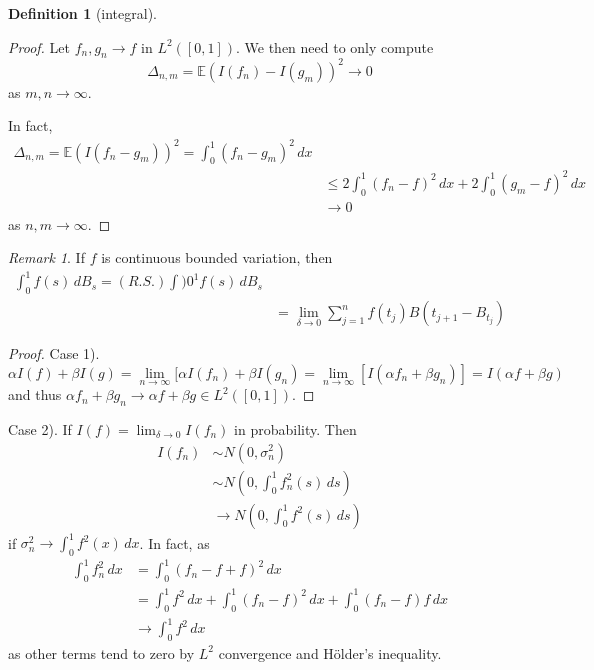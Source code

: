 \documentclass[10pt, oneside, reqno]{amsart}
\theoremstyle{plain}%
\theoremstyle{definition}
\newtheorem{defn}[thm]{Definition}
\theoremstyle{remark}
\newtheorem*{rem}{Remark}
\newcommand{\E}{\mathbb{E}}
\begin{document}
\begin{defn}[\ito integral]
    \begin{proof}
        Let $f_n, g_n \rightarrow f$ in $L^2([0,1])$.  We then need to only compute \[
            \Delta_{n,m} = \E(I(f_n) - I(g_m) )^2 \rightarrow 0
        \] as $m,n \rightarrow \infty$. 
        
        In fact, \begin{align*} 
            \Delta_{n,m} = \E(I(f_n - g_m))^2 = \int_0^1 (f_n - g_m)^2 \, dx \\
                        &\leq 2 \int_0^1 ( f_n - f)^2 \, dx + 2 \int_0^1 (g_m - f)^2 \, dx \\
                        &\rightarrow 0
        \end{align*} as $n,m \rightarrow \infty$.  
    \end{proof}
    
    \begin{rem}
        If $f$ is continuous bounded variation, then 
        \begin{align*}
            \int_0^1 f(s) \, dB_s = (R.S.) \int)0^1 f(s) \, dB_s \\
                &= \lim_{\delta \rightarrow 0} \sum_{j=1}^n f(t_j) B(t_{j+1} - B_{t_j})
        \end{align*}
    \end{rem}
    \begin{proof}
    Case 1).
        \[
            \alpha I(f) + \beta I(g) = \lim_{n \rightarrow \infty} [ \alpha I(f_n) + \beta I(g_n) = \lim_{n \rightarrow \infty} [ I(\alpha f_n + \beta g_n)] = I(\alpha f + \beta g)
        \]
        and thus $\alpha f_n + \beta g_n \rightarrow \alpha f + \beta g \in L^2([0,1])$.   
    \end{proof}
    
    Case 2).  If $I(f) = \lim_{ \delta \rightarrow 0} I(f_n)$ in probability.  Then 
    \begin{align*}
        I(f_n) &\sim N(0, \sigma_n^2) \\
                &\sim N(0, \int_0^1 f_n^2(s) \,ds) \\
                &\rightarrow N(0, \int_0^1 f^2(s) \, ds)    
    \end{align*} if $\sigma^2_n \rightarrow \int_0^1 f^2(x) \, dx$.  In fact, as 
    \begin{align*}
        \int_0^1 f_n^2 \, dx &= \int_0^1 (f_n - f + f)^2 \, dx \\
                                &= \int_0^1 f^2 \, dx + \int_0^1 (f_n - f)^2 \, dx + \int_0^1 (f_n - f) f \, dx\\
                                &\rightarrow \int_0^1 f^2 \, dx
    \end{align*} as other terms tend to zero by $L^2$ convergence and H\"older's inequality.
    

\end{defn}
\end{document}
